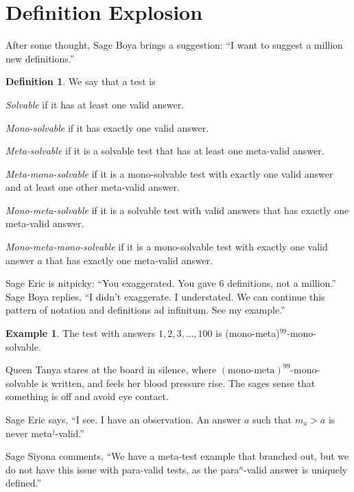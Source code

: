 \documentclass[12pt,reqno]{article}
\theoremstyle{plain}
\theoremstyle{definition}
\newtheorem{definition}{Definition}
\newtheorem{example}{Example}
\theoremstyle{remark}
\newenvironment{packed_item}{
\begin{itemize}
\setlength{\itemsep}{1pt}
\setlength{\parskip}{0pt}
\setlength{\parsep}{0pt}
}{\end{itemize}}
\begin{document}
\section*{Definition Explosion}

After some thought, Sage Boya brings a suggestion: ``I want to suggest a million new definitions.''

\begin{definition}
We say that a test is
\begin{packed_item}
\item \textit{Solvable} if it has at least one valid answer.
\item \textit{Mono-solvable} if it has exactly one valid answer.
\item \textit{Meta-solvable} if it is a solvable test that has at least one meta-valid answer.
\item \textit{Meta-mono-solvable} if it is a mono-solvable test with exactly one valid answer and at least one other meta-valid answer.
\item \textit{Mono-meta-solvable} if it is a solvable test with valid answers that has exactly one meta-valid answer.
\item \textit{Mono-meta-mono-solvable} if it is a mono-solvable test with exactly one valid answer $a$ that has exactly one meta-valid answer.
\end{packed_item}
\end{definition}

Sage Eric is nitpicky: ``You exaggerated. You gave $6$ definitions, not a million.'' Sage Boya replies, ``I didn't exaggerate. I understated. We can continue this pattern of notation and definitions ad infinitum. See my example.''

\begin{example}
The test with answers $1,2,3,\dots,100$ is (mono-meta)$^{99}$-mono-solvable.
\end{example}

Queen Tanya stares at the board in silence, where $(\text{mono-meta})^{99}$-mono-solvable is written, and feels her blood pressure rise. The sages sense that something is off and avoid eye contact.

Sage Eric says, ``I see. I have an observation. An answer $a$ such that $m_a > a$ is never meta$^j$-valid.''

Sage Siyona comments, ``We have a meta-test example that branched out, but we do not have this issue with para-valid tests, as the para$^n$-valid answer is uniquely defined.''
\end{document}
